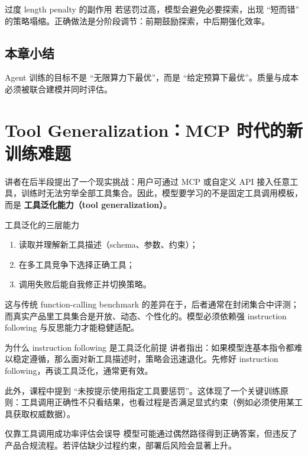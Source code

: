 \documentclass[a4paper]{article}
\begin{document}
\begin{warningbox}{过度 length penalty 的副作用}
若惩罚过高，模型会避免必要探索，出现 ``短而错'' 的策略塌缩。正确做法是分阶段调节：前期鼓励探索，中后期强化效率。
\end{warningbox}

\subsection{本章小结}
Agent 训练的目标不是 ``无限算力下最优''，而是 ``给定预算下最优''。质量与成本必须被联合建模并同时评估。

\section{Tool Generalization：MCP 时代的新训练难题}

讲者在后半段提出了一个现实挑战：用户可通过 MCP 或自定义 API 接入任意工具，训练时无法穷举全部工具集合。因此，模型要学习的不是固定工具调用模板，而是 \textbf{工具泛化能力（tool generalization）}。

\begin{knowledgebox}{工具泛化的三层能力}
\begin{enumerate}
    \item 读取并理解新工具描述（schema、参数、约束）；
    \item 在多工具竞争下选择正确工具；
    \item 调用失败后能自我修正并切换策略。
\end{enumerate}
\end{knowledgebox}

这与传统 function-calling benchmark 的差异在于，后者通常在封闭集合中评测；而真实产品里工具集合是开放、动态、个性化的。模型必须依赖强 instruction following 与反思能力才能稳健适配。

\begin{importantbox}{为什么 instruction following 是工具泛化前提}
讲者指出：如果模型连基本指令都难以稳定遵循，那么面对新工具描述时，策略会迅速退化。先修好 instruction following，再谈工具泛化，通常更有效。
\end{importantbox}

此外，课程中提到 ``未按提示使用指定工具要惩罚''。这体现了一个关键训练原则：工具调用正确性不只看结果，也看过程是否满足显式约束（例如必须使用某工具获取权威数据）。

\begin{warningbox}{仅靠工具调用成功率评估会误导}
模型可能通过偶然路径得到正确答案，但违反了产品合规流程。若评估缺少过程约束，部署后风险会显著上升。
\end{warningbox}
\end{document}
